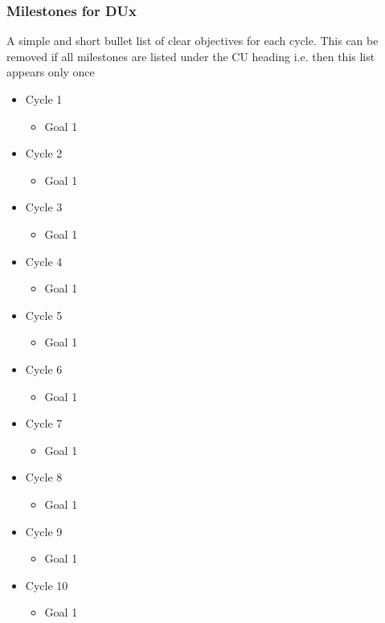 \documentclass[CUx,lsstdraft,SDP]{lsstdoc}
\begin{document}
\subsubsection{Milestones for DUx \label{sect:milestones}}
A simple and short bullet list of clear objectives for each cycle.
This can be removed if all milestones are listed under the CU heading
i.e. then this list appears only once
\begin{itemize}
  \item Cycle 1
  \begin {itemize}
    \item Goal 1
  \end{itemize}
    \item Cycle 2
  \begin {itemize}
    \item Goal 1
   \end{itemize}
    \item Cycle 3
  \begin {itemize}
    \item Goal 1
  \end{itemize}
    \item Cycle 4
  \begin {itemize}
    \item Goal 1
  \end{itemize}
    \item Cycle 5
  \begin {itemize}
    \item Goal 1
  \end{itemize}
    \item Cycle 6
  \begin {itemize}
    \item Goal 1
  \end{itemize}
    \item Cycle 7
  \begin {itemize}
    \item Goal 1
  \end{itemize}
    \item Cycle 8
  \begin {itemize}
    \item Goal 1
  \end{itemize}
    \item Cycle 9
  \begin {itemize}
    \item Goal 1
  \end{itemize}
    \item Cycle 10
  \begin {itemize}
    \item Goal 1
  \end{itemize}
\end{itemize}
\end{document}
